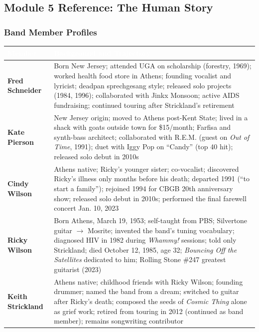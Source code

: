 \documentclass[11pt,letterpaper]{article}
\newcommand{\tableheader}[1]{\textbf{\sffamily\textcolor{white}{#1}}}
\begin{document}
\subsection{Module 5 Reference: The Human Story}

\subsubsection{Band Member Profiles}

\begin{center}
\begin{tabularx}{\textwidth}{L{2.8cm}X}
\toprule
{}
\tableheader{Member} & \tableheader{Background and Trajectory} \\
\midrule
\textbf{Fred Schneider} & Born New Jersey; attended UGA on scholarship (forestry, 1969); worked health food store in Athens; founding vocalist and lyricist; deadpan sprechgesang style; released solo projects (1984, 1996); collaborated with Jinkx Monsoon; active AIDS fundraising; continued touring after Strickland's retirement \\
\textbf{Kate Pierson} & New Jersey origin; moved to Athens post-Kent State; lived in a shack with goats outside town for \$15/month; Farfisa and synth-bass architect; collaborated with R.E.M. (guest on \textit{Out of Time}, 1991); duet with Iggy Pop on ``Candy'' (top 40 hit); released solo debut in 2010s \\
\textbf{Cindy Wilson} & Athens native; Ricky's younger sister; co-vocalist; discovered Ricky's illness only months before his death; departed 1991 (``to start a family''); rejoined 1994 for CBGB 20th anniversary show; released solo debut in 2010s; performed the final farewell concert Jan. 10, 2023 \\
\textbf{Ricky Wilson} & Born Athens, March 19, 1953; self-taught from PBS; Silvertone guitar $\rightarrow$ Mosrite; invented the band's tuning vocabulary; diagnosed HIV in 1982 during \textit{Whammy!} sessions; told only Strickland; died October 12, 1985, age 32; \textit{Bouncing Off the Satellites} dedicated to him; Rolling Stone \#247 greatest guitarist (2023) \\
\textbf{Keith Strickland} & Athens native; childhood friends with Ricky Wilson; founding drummer; named the band from a dream; switched to guitar after Ricky's death; composed the seeds of \textit{Cosmic Thing} alone as grief work; retired from touring in 2012 (continued as band member); remains songwriting contributor \\
\bottomrule
\end{tabularx}
\end{center}
\end{document}
